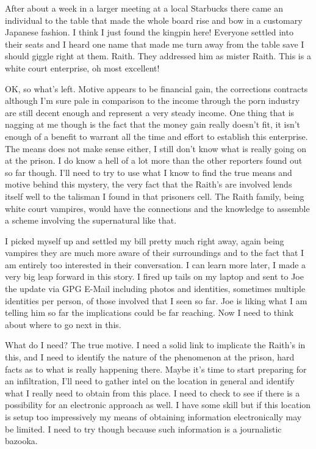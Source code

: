 After about a week in a larger meeting at a local Starbucks there came an individual to the table that made the whole board rise and bow in a customary Japanese fashion. I think I just found the kingpin here! Everyone settled into their seats and I heard one name that made me turn away from the table save I should giggle right at them. Raith. They addressed him as mister Raith. This is a white court enterprise, oh most excellent!

OK, so what's left. Motive appears to be financial gain, the corrections contracts although I'm sure pale in comparison to the income through the porn industry are still decent enough and represent a very steady income. One thing that is nagging at me though is the fact that the money gain really doesn't fit, it isn't enough of a benefit to warrant all the time and effort to establish this enterprise. The means does not make sense either, I still don't know what is really going on at the prison. I do know a hell of a lot more than the other reporters found out so far though. I'll need to try to use what I know to find the true means and motive behind this mystery, the very fact that the Raith's are involved lends itself well to the talisman I found in that prisoners cell. The Raith family, being white court vampires, would have the connections and the knowledge to assemble a scheme involving the supernatural like that.

I picked myself up and settled my bill pretty much right away, again being vampires they are much more aware of their surroundings and to the fact that I am entirely too interested in their conversation. I can learn more later, I made a very big leap forward in this story. I fired up tails on my laptop and sent to Joe the update via GPG E-Mail including photos and identities, sometimes multiple identities per person, of those involved that I seen so far. Joe is liking what I am telling him so far the implications could be far reaching. Now I need to think about where to go next in this.

What do I need? The true motive. I need a solid link to implicate the Raith's in this, and I need to identify the nature of the phenomenon at the prison, hard facts as to what is really happening there. Maybe it's time to start preparing for an infiltration, I'll need to gather intel on the location in general and identify what I really need to obtain from this place. I need to check to see if there is a possibility for an electronic approach as well. I have some skill but if this location is setup too impressively my means of obtaining information electronically may be limited. I need to try though because such information is a journalistic bazooka.

